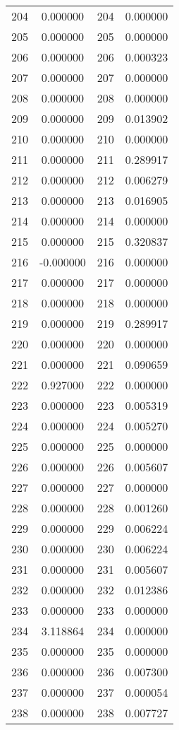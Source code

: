 \documentclass[12pt]{article}
\begin{document}
\begin{longtable}{@{}cccc@{}}
204 & 0.000000 & 204 & 0.000000 \\
205 & 0.000000 & 205 & 0.000000 \\
206 & 0.000000 & 206 & 0.000323 \\
207 & 0.000000 & 207 & 0.000000 \\
208 & 0.000000 & 208 & 0.000000 \\
209 & 0.000000 & 209 & 0.013902 \\
210 & 0.000000 & 210 & 0.000000 \\
211 & 0.000000 & 211 & 0.289917 \\
212 & 0.000000 & 212 & 0.006279 \\
213 & 0.000000 & 213 & 0.016905 \\
214 & 0.000000 & 214 & 0.000000 \\
215 & 0.000000 & 215 & 0.320837 \\
216 & -0.000000 & 216 & 0.000000 \\
217 & 0.000000 & 217 & 0.000000 \\
218 & 0.000000 & 218 & 0.000000 \\
219 & 0.000000 & 219 & 0.289917 \\
220 & 0.000000 & 220 & 0.000000 \\
221 & 0.000000 & 221 & 0.090659 \\
222 & 0.927000 & 222 & 0.000000 \\
223 & 0.000000 & 223 & 0.005319 \\
224 & 0.000000 & 224 & 0.005270 \\
225 & 0.000000 & 225 & 0.000000 \\
226 & 0.000000 & 226 & 0.005607 \\
227 & 0.000000 & 227 & 0.000000 \\
228 & 0.000000 & 228 & 0.001260 \\
229 & 0.000000 & 229 & 0.006224 \\
230 & 0.000000 & 230 & 0.006224 \\
231 & 0.000000 & 231 & 0.005607 \\
232 & 0.000000 & 232 & 0.012386 \\
233 & 0.000000 & 233 & 0.000000 \\
234 & 3.118864 & 234 & 0.000000 \\
235 & 0.000000 & 235 & 0.000000 \\
236 & 0.000000 & 236 & 0.007300 \\
237 & 0.000000 & 237 & 0.000054 \\
238 & 0.000000 & 238 & 0.007727 \\

\end{longtable}
\end{document}
